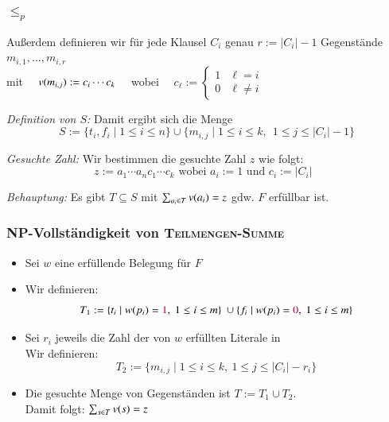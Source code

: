 \documentclass[aspectratio=1610,onlymath]{beamer}
\begin{document}

\begin{frame}
  \frametitle{ $\leq_p$ }

  Außerdem definieren wir für jede Klausel $C_i$ genau $r := |C_i|-1$ Gegenstände
  $m_{i,1}, \ldots, m_{i,r}$\\[5pt]
  mit $\quad v(m_{i, j}) := c_i \cdots c_k\quad$ wobei
  $\quad
  c_\ell :=
  \begin{cases}
    1 & \ell=i\\
    0 & \ell\not= i
  \end{cases}
  $\bigskip\pause

  \emph{Definition von $S$: } Damit ergibt sich die Menge
  \[
     S := \{ t_i, f_i \mid 1\leq i \leq
       n\} \cup \{ m_{i,j} \mid 1\leq i\leq k,~~ 1\leq j \leq |C_i|-1\}
  \]

  \pause\emph{Gesuchte Zahl: } Wir bestimmen die gesuchte Zahl $z$ wie folgt:\\
  \[
     \text{$z := a_1 \cdots a_n c_1 \cdots c_k$ wobei $a_i := 1$ und $c_i := |C_i|$ }
  \]

  \bigskip

  \pause\emph{Behauptung: } Es gibt $T\subseteq S$ mit $\sum_{a_i\in T}
    v(a_i) = z$ gdw. $F$ erfüllbar ist.
\end{frame}


\begin{frame}\frametitle{NP-Vollständigkeit von \textsc{Teilmengen-Summe}}

\bigskip

%
\pause
\begin{itemize}
\item Sei $w$ eine erfüllende Belegung für $F$\pause\\[2ex]
%
\item Wir definieren: 
    \[T_1 :=
		\{ t_i \mid w(p_i) = \textcolor{purple}{1},~ 1\leq i \leq m\}\
			\cup \{ f_i \mid w(p_i) = \textcolor{purple}{0},~ 1\leq i \leq m\}
    \]\pause%
\item Sei $r_i$ jeweils die Zahl der von $w$ erfüllten Literale in \\
Wir definieren:
\[T_2 := \{ m_{i,j}\mid 1\leq i \leq k,~ 1\leq j \leq |C_i|-r_i \}\]\pause%
% 
\item Die gesuchte Menge von Gegenständen ist $T := T_1 \cup T_2$.\\[5pt]
Damit folgt: $\sum_{s\in T} v(s) = z$
\end{itemize}
\end{frame}
\end{document}

